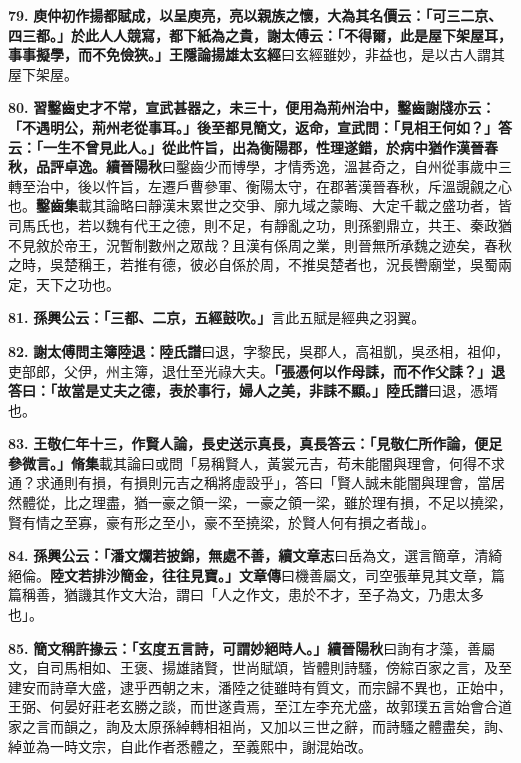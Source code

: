 \textbf{79.} \textbf{庾仲初作揚都賦成，以呈庾亮，亮以親族之懷，大為其名價云：「可三二京、四三都。」於此人人競寫，都下紙為之貴，謝太傅云：「不得爾，此是屋下架屋耳，事事擬學，而不免儉狹。」}{\footnotesize \textbf{王隱論揚雄太玄經}曰玄經雖妙，非益也，是以古人謂其屋下架屋。}

\textbf{80.} \textbf{習鑿齒史才不常，宣武甚器之，未三十，便用為荊州治中，鑿齒謝牋亦云：「不遇明公，荊州老從事耳。」後至都見簡文，返命，宣武問：「見相王何如？」答云：「一生不曾見此人。」從此忤旨，出為衡陽郡，性理遂錯，於病中猶作漢晉春秋，品評卓逸。}{\footnotesize \textbf{續晉陽秋}曰鑿齒少而博學，才情秀逸，溫甚奇之，自州從事歲中三轉至治中，後以忤旨，左遷戶曹參軍、衡陽太守，在郡著漢晉春秋，斥溫覬覦之心也。\textbf{鑿齒集}載其論略曰靜漢末累世之交爭、廓九域之蒙晦、大定千載之盛功者，皆司馬氏也，若以魏有代王之德，則不足，有靜亂之功，則孫劉鼎立，共王、秦政猶不見敘於帝王，況暫制數州之眾哉？且漢有係周之業，則晉無所承魏之迹矣，春秋之時，吳楚稱王，若推有德，彼必自係於周，不推吳楚者也，況長轡廟堂，吳蜀兩定，天下之功也。}

\textbf{81.} \textbf{孫興公云：「三都、二京，五經鼓吹。」}{\footnotesize 言此五賦是經典之羽翼。}

\textbf{82.} \textbf{謝太傅問主簿陸退：}{\footnotesize \textbf{陸氏譜}曰退，字黎民，吳郡人，高祖凱，吳丞相，祖仰，吏部郎，父伊，州主簿，退仕至光祿大夫。}\textbf{「張憑何以作母誄，而不作父誄？」退答曰：「故當是丈夫之德，表於事行，婦人之美，非誄不顯。」}{\footnotesize \textbf{陸氏譜}曰退，憑壻也。}

\textbf{83.} \textbf{王敬仁年十三，作賢人論，長史送示真長，真長答云：「見敬仁所作論，便足參微言。」}{\footnotesize \textbf{脩集}載其論曰或問「易稱賢人，黃裳元吉，苟未能闇與理會，何得不求通？求通則有損，有損則元吉之稱將虛設乎」，答曰「賢人誠未能闇與理會，當居然體從，比之理盡，猶一豪之領一梁，一豪之領一梁，雖於理有損，不足以撓梁，賢有情之至寡，豪有形之至小，豪不至撓梁，於賢人何有損之者哉」。}

\textbf{84.} \textbf{孫興公云：「潘文爛若披錦，無處不善，}{\footnotesize \textbf{續文章志}曰岳為文，選言簡章，清綺絕倫。}\textbf{陸文若排沙簡金，往往見寶。」}{\footnotesize \textbf{文章傳}曰機善屬文，司空張華見其文章，篇篇稱善，猶譏其作文大治，謂曰「人之作文，患於不才，至子為文，乃患太多也」。}

\textbf{85.} \textbf{簡文稱許掾云：「玄度五言詩，可謂妙絕時人。」}{\footnotesize \textbf{續晉陽秋}曰詢有才藻，善屬文，自司馬相如、王褒、揚雄諸賢，世尚賦頌，皆體則詩騷，傍綜百家之言，及至建安而詩章大盛，逮乎西朝之末，潘陸之徒雖時有質文，而宗歸不異也，正始中，王弼、何晏好莊老玄勝之談，而世遂貴焉，至江左李充尤盛，故郭璞五言始會合道家之言而韻之，詢及太原孫綽轉相祖尚，又加以三世之辭，而詩騷之體盡矣，詢、綽並為一時文宗，自此作者悉體之，至義熙中，謝混始改。}


